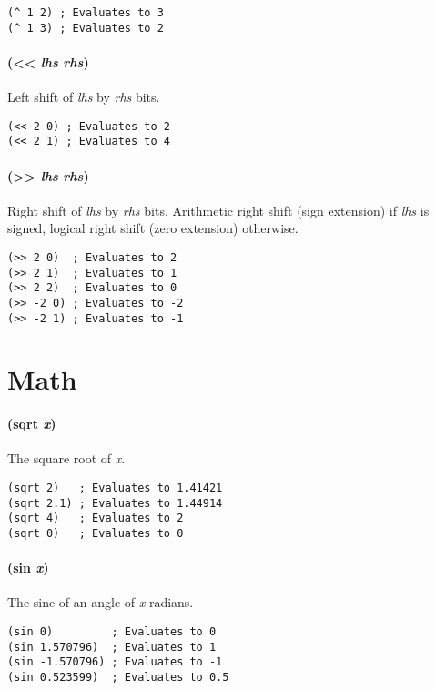\documentclass[numbers=noenddot]{scrbook}
\begin{document}
\begin{verbatim}
(^ 1 2) ; Evaluates to 3
(^ 1 3) ; Evaluates to 2
\end{verbatim}

\paragraph{(<< \emph{lhs} \emph{rhs})}
Left shift of \emph{lhs} by \emph{rhs} bits.

\begin{verbatim}
(<< 2 0) ; Evaluates to 2
(<< 2 1) ; Evaluates to 4
\end{verbatim}

\paragraph{(>> \emph{lhs} \emph{rhs})}
Right shift of \emph{lhs} by \emph{rhs} bits.
Arithmetic right shift (sign extension) if \emph{lhs} is signed, logical right shift (zero extension) otherwise.

\begin{verbatim}
(>> 2 0)  ; Evaluates to 2
(>> 2 1)  ; Evaluates to 1
(>> 2 2)  ; Evaluates to 0
(>> -2 0) ; Evaluates to -2
(>> -2 1) ; Evaluates to -1
\end{verbatim}

\section{Math}
\paragraph{(sqrt \emph{x})}
The square root of \emph{x}.

\begin{verbatim}
(sqrt 2)   ; Evaluates to 1.41421
(sqrt 2.1) ; Evaluates to 1.44914
(sqrt 4)   ; Evaluates to 2
(sqrt 0)   ; Evaluates to 0
\end{verbatim}

\paragraph{(sin \emph{x})}
The sine of an angle of \emph{x} radians.

\begin{verbatim}
(sin 0)         ; Evaluates to 0
(sin 1.570796)  ; Evaluates to 1
(sin -1.570796) ; Evaluates to -1
(sin 0.523599)  ; Evaluates to 0.5
\end{verbatim}
\end{document}
